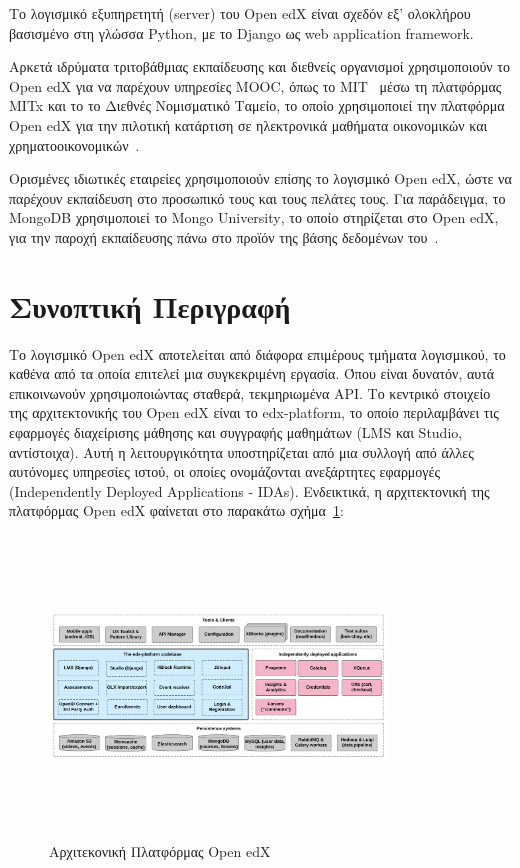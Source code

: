 \documentclass[12pt]{report}
\begin{document}
Το λογισμικό εξυπηρετητή (\textlatin{server}) του \textlatin{Open edX} είναι σχεδόν εξ' ολοκλήρου βασισμένο στη γλώσσα \textlatin{Python}, με το \textlatin{Django} ως \textlatin{web application framework}.

Αρκετά ιδρύματα τριτοβάθμιας εκπαίδευσης και διεθνείς οργανισμοί χρησιμοποιούν το \textlatin{Open edX} για να παρέχουν υπηρεσίες \textlatin{MOOC}, όπως το \textlatin{MIT}~\cite{mit_open_learning_2018} μέσω τη πλατφόρμας \textlatin{MITx} και το το Διεθνές Νομισματικό Ταμείο, το οποίο χρησιμοποιεί την πλατφόρμα \textlatin{Open edX} για την πιλοτική κατάρτιση σε ηλεκτρονικά μαθήματα οικονομικών και χρηματοοικονομικών~\cite{edx_2014}.

Ορισμένες ιδιωτικές εταιρείες χρησιμοποιούν επίσης το λογισμικό \textlatin{Open edX}, ώστε να παρέχουν εκπαίδευση στο προσωπικό τους και τους πελάτες τους. Για παράδειγμα, το \textlatin{MongoDB} χρησιμοποιεί το \textlatin{Mongo University}, το οποίο στηρίζεται στο \textlatin{Open edX}, για την παροχή εκπαίδευσης πάνω στο προϊόν της βάσης δεδομένων του~\cite{mongodb}.

\section{Συνοπτική Περιγραφή}
Το λογισμικό \textlatin{Open edX} αποτελείται από διάφορα επιμέρους τμήματα λογισμικού, το καθένα από τα οποία επιτελεί μια συγκεκριμένη εργασία. Όπου είναι δυνατόν, αυτά επικοινωνούν χρησιμοποιώντας σταθερά, τεκμηριωμένα \textlatin{API}. Το κεντρικό στοιχείο της αρχιτεκτονικής του \textlatin{Open edX} είναι το \textlatin{edx-platform}, το οποίο περιλαμβάνει τις εφαρμογές διαχείρισης μάθησης και συγγραφής μαθημάτων (\textlatin{LMS} και \textlatin{Studio}, αντίστοιχα). Αυτή η λειτουργικότητα υποστηρίζεται από μια συλλογή από άλλες αυτόνομες υπηρεσίες ιστού, οι οποίες ονομάζονται ανεξάρτητες εφαρμογές (\textlatin{Independently Deployed Applications - IDAs}). Ενδεικτικά, η αρχιτεκτονική της πλατφόρμας \textlatin{Open edX} φαίνεται στο παρακάτω σχήμα~\ref{fig:edx_arch}:
\begin{figure}[!htbp]
\centering
\includegraphics[width=0.8\textwidth, height=8cm]{edx-architecture}
\caption{Αρχιτεκονική Πλατφόρμας \textlatin{Open edX}}
\label{fig:edx_arch}
\end{figure}
\end{document}
